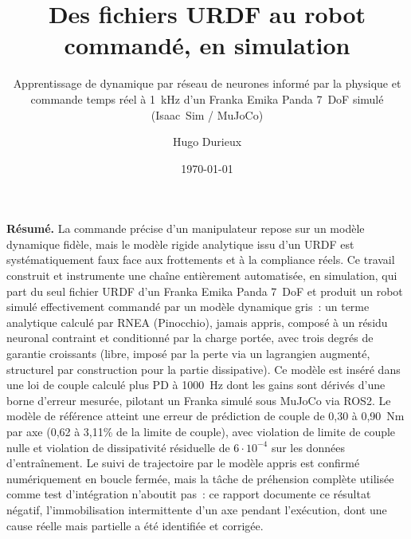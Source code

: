 \documentclass[a4paper, oneside]{article}
\author{Hugo Durieux}
\date{\today}
\title{Des fichiers URDF au robot commandé, en simulation}
\subtitle{Apprentissage de dynamique par réseau de neurones informé par la
physique et commande temps réel à \SI{1}{kHz} d'un Franka Emika Panda 7~DoF
simulé (Isaac~Sim / MuJoCo)}
\begin{document}
\maketitle

\begin{center}
\begin{minipage}{0.88\textwidth}
\small
\textbf{Résumé.} La commande précise d'un manipulateur repose sur un modèle
dynamique fidèle, mais le modèle rigide analytique issu d'un URDF est
systématiquement faux face aux frottements et à la compliance réels. Ce
travail construit et instrumente une chaîne entièrement automatisée, en
simulation, qui part du seul fichier URDF d'un Franka Emika Panda 7~DoF et
produit un robot simulé effectivement commandé par un modèle dynamique gris~:
un terme analytique calculé par RNEA (Pinocchio), jamais appris, composé à un
résidu neuronal contraint et conditionné par la charge portée, avec trois
degrés de garantie croissants (libre, imposé par la perte via un lagrangien
augmenté, structurel par construction pour la partie dissipative). Ce modèle
est inséré dans une loi de couple calculé plus PD à \SI{1000}{Hz} dont les gains
sont dérivés d'une borne d'erreur mesurée, pilotant un Franka simulé sous
MuJoCo via ROS2. Le modèle de référence atteint une erreur de prédiction de
couple de 0,30 à 0,90~Nm par axe (0,62 à 3,11\% de la limite de couple), avec
violation de limite de couple nulle et violation de dissipativité résiduelle
de $6\cdot 10^{-4}$ sur les données d'entraînement. Le suivi de trajectoire
par le modèle appris est confirmé numériquement en boucle fermée, mais la
tâche de préhension complète utilisée comme test d'intégration n'aboutit pas~:
ce rapport documente ce résultat négatif, l'immobilisation intermittente d'un
axe pendant l'exécution, dont une cause réelle mais partielle a été identifiée
et corrigée.


\end{minipage}
\end{center}
\end{document}
